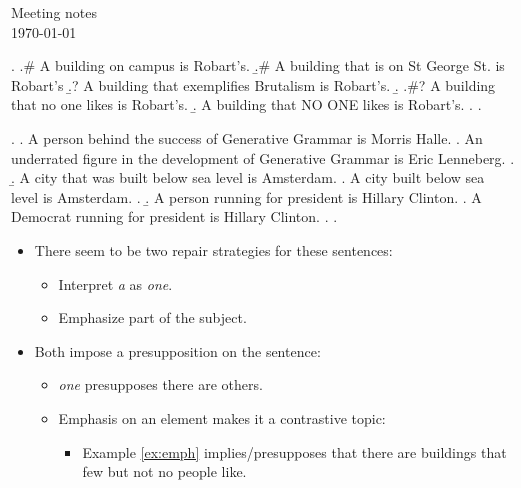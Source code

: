 \documentclass[letterpaper]{article}
\begin{document}
\begin{center}
  {\Large Meeting notes}\\
  \today
\end{center}
\ex.
  \a.\# A building on campus is Robart's.
  \b.\# A building that is on St George St. is Robart's
  \b.? A building that exemplifies Brutalism is Robart's.
  \b.
    \a.\#? A building that no one likes is Robart's.
    \b.\label{ex:emph} A building that NO ONE likes is Robart's.
    \z.
  \z.

\ex. 
  \a. A person behind the success of Generative Grammar is Morris Halle.
    \a. An underrated figure in the development of Generative Grammar is Eric Lenneberg.
    \z.
  \b. A city that was built below sea level is Amsterdam.
    \a. A city built below sea level is Amsterdam.
    \z.
  \b. A person running for president is Hillary Clinton.
    \a. A Democrat running for president is Hillary Clinton.
    \z.
  \z.

\begin{itemize}
  \item There seem to be two repair strategies for these sentences:
    \begin{itemize}
      \item Interpret \textit{a} as \textit{one}.
      \item Emphasize part of the subject.
    \end{itemize}
  \item Both impose a presupposition on the sentence:
    \begin{itemize}
      \item \textit{one} presupposes there are others.
      \item Emphasis on an element makes it a contrastive topic:
	\begin{itemize}
	  \item Example \ref{ex:emph} implies/presupposes that there are buildings that few but not no people like.
	\end{itemize}
    \end{itemize}
\end{itemize}
\end{document}
